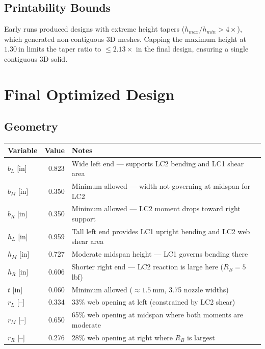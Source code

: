 \documentclass[11pt,letterpaper]{article}
\begin{document}
\subsection{Printability Bounds}

Early runs produced designs with extreme height tapers
($h_{max}/h_{min} > 4\times$), which generated non-contiguous 3D meshes.
Capping the maximum height at $1.30\ \mathrm{in}$ limits the taper ratio
to $\le 2.13\times$ in the final design, ensuring a single contiguous
3D solid.


\section{Final Optimized Design}
\label{sec:design}

\subsection{Geometry}

\begin{center}
\begin{tabular}{lrl}
\toprule
Variable & Value & Notes \\
\midrule
$b_L$ [in] & 0.823 & Wide left end --- supports LC2 bending and LC1 shear area \\
$b_M$ [in] & 0.350 & Minimum allowed --- width not governing at midspan for LC2 \\
$b_R$ [in] & 0.350 & Minimum allowed --- LC2 moment drops toward right support \\
$h_L$ [in] & 0.959 & Tall left end provides LC1 upright bending and LC2 web shear area \\
$h_M$ [in] & 0.727 & Moderate midspan height --- LC1 governs bending there \\
$h_R$ [in] & 0.606 & Shorter right end --- LC2 reaction is large here ($R_B=5$ lbf) \\
$t$ [in]   & 0.060 & Minimum allowed ($\approx 1.5\ \mathrm{mm}$, 3.75 nozzle widths) \\
$r_L$ [--] & 0.334 & 33\% web opening at left (constrained by LC2 shear) \\
$r_M$ [--] & 0.650 & 65\% web opening at midspan where both moments are moderate \\
$r_R$ [--] & 0.276 & 28\% web opening at right where $R_B$ is largest \\
\bottomrule
\end{tabular}
\end{center}
\end{document}
